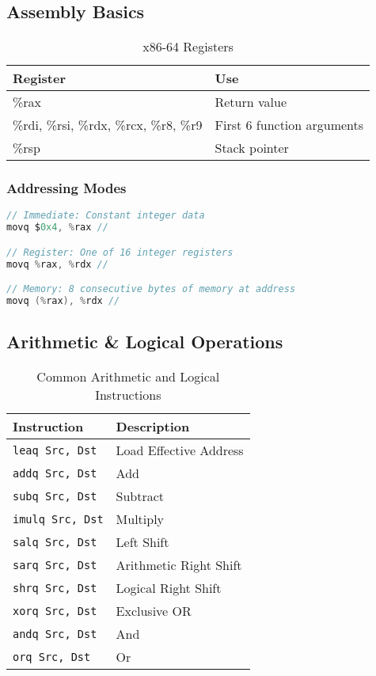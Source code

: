 \documentclass[10pt]{article}
\begin{document}
\subsection{Assembly Basics}
\begin{table}[h]
    \centering
    \caption{x86-64 Registers}
    \begin{tabular}{ll}
        \toprule
        Register & Use \\
        \midrule
        \%rax & Return value \\
        \%rdi, \%rsi, \%rdx, \%rcx, \%r8, \%r9 & First 6 function arguments \\
        \%rsp & Stack pointer \\
        \bottomrule
    \end{tabular}
\end{table}

\subsubsection{Addressing Modes}
\begin{lstlisting}[language=c]
// Immediate: Constant integer data
movq $0x4, %rax //

// Register: One of 16 integer registers
movq %rax, %rdx //

// Memory: 8 consecutive bytes of memory at address
movq (%rax), %rdx //
\end{lstlisting}

\subsection{Arithmetic \& Logical Operations}
\begin{table}[h]
    \centering
    \caption{Common Arithmetic and Logical Instructions}
    \begin{tabular}{ll}
        \toprule
        Instruction & Description \\
        \midrule
        \texttt{leaq Src, Dst} & Load Effective Address \\
        \texttt{addq Src, Dst} & Add \\
        \texttt{subq Src, Dst} & Subtract \\
        \texttt{imulq Src, Dst} & Multiply \\
        \texttt{salq Src, Dst} & Left Shift \\
        \texttt{sarq Src, Dst} & Arithmetic Right Shift \\
        \texttt{shrq Src, Dst} & Logical Right Shift \\
        \texttt{xorq Src, Dst} & Exclusive OR \\
        \texttt{andq Src, Dst} & And \\
        \texttt{orq Src, Dst} & Or \\
        \bottomrule
    \end{tabular}
\end{table}
\end{document}
